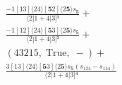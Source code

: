 \documentclass[varwidth, border=5pt]{standalone}
\begin{document}
\begin{my}
$\begin{gathered}
\scriptscriptstyle\frac{-1[13]⟨24⟩[𝟓2]⟨2𝟓⟩s_{𝟓}}{⟨2|1+4|3]³} +\\
\scriptscriptstyle\frac{-1[12]⟨24⟩[𝟓3]⟨2𝟓⟩s_{𝟓}}{⟨2|1+4|3]³} +\\
\scriptscriptstyle(43215,\;\text{True},\;-) +\\
\scriptscriptstyle\frac{3[13]⟨24⟩[𝟓3]⟨2𝟓⟩s_{𝟓}(s_{124}-s_{134})}{⟨2|1+4|3]⁴} \phantom{+}
\end{gathered}$
\end{my}
\end{document}
